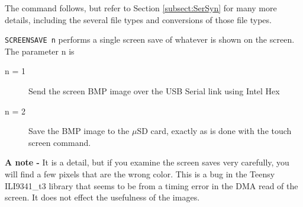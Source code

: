  The command follows, but refer to Section \ref{subsect:SerSyn} for many more details, including the several file types and conversions of those file types.

\texttt{SCREENSAVE n} performs a single screen save of whatever is shown on the screen.  The parameter n is
\begin{description}
\item[n = 1] Send the screen BMP image over the USB Serial link using Intel Hex
\item[n = 2] Save the BMP image to the $\mu$SD card, exactly as is done with the touch screen command.
\end{description}

\textbf{A note - }It is a detail, but if you examine the screen saves very carefully, you will find a few pixels that are the wrong color. This is a bug in the Teensy ILI9341\_t3 library that seems to be from a timing error in the DMA read of the screen. It does not effect the usefulness of the images.